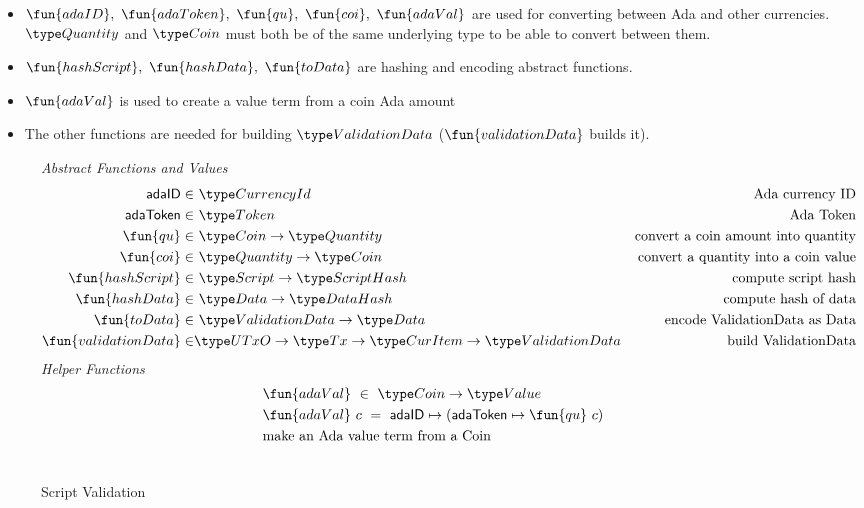 \begin{itemize}
  \item $\fun{adaID},~\fun{adaToken},~\fun{qu},~\fun{coi},~\fun{adaVal}$ are used
  for converting between Ada and other currencies. $\Quantity$ and $\Coin$
  must both be of the same underlying type to be able to convert between them.
  \item $\fun{hashScript},~ \fun{hashData},~\fun{toData}$ are hashing and encoding
  abstract functions.
  \item $\fun{adaVal}$ is used to create a value term from a coin Ada amount
  \item The other functions are needed for building $\ValidationData$
  ($\fun{validationData}$ builds it).
\end{itemize}

\begin{figure*}[htb]
  \emph{Abstract Functions and Values}
  \begin{align*}
    \mathsf{adaID} \in& ~\CurrencyId
    & \text{Ada currency ID} \\
    \mathsf{adaToken} \in& ~\Token
    & \text{Ada Token} \\
    \fun{qu} \in& ~\Coin \to \Quantity
    & \text{convert a coin amount into quantity} \\
    \fun{coi} \in& ~\Quantity \to \Coin
    & \text{convert a quantity into a coin value} \\
    \fun{hashScript} \in & ~\Script\to \HashScr
    & \text{compute script hash} \\
    \fun{hashData} \in & ~\Data \to \HashDat
    & \text{compute hash of data} \\
    \fun{toData} \in & ~ \ValidationData\to \Data 
    & \text{encode ValidationData as Data} \\
    \fun{validationData} \in & \UTxO \to \Tx \to \CurItem \to \ValidationData
    & \text{build ValidationData} \\
  \end{align*}
  \emph{Helper Functions}
  \begin{align*}
    &\fun{adaVal} ~\in~ \Coin \to \Value \\
    &\fun{adaVal}~{c} ~=~ \mathsf{adaID} \mapsto (\mathsf{adaToken} \mapsto  \fun{qu}~c) \\
    & \text{make an Ada value term from a Coin} \\~\\
  \end{align*}
  \caption{Script Validation}
  \label{fig:defs:functions-helper}
\end{figure*}


